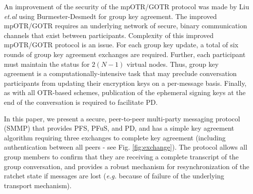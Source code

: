 \documentclass[%
preprint,
amsmath,amssymb,
aps,
prb,
floatfix,
]{revtex4-1}
\begin{document}
An improvement of the security of the mpOTR/GOTR protocol was made by Liu
\textit{et.al}\cite{ref:liu} using Burmester-Desmedt\cite{ref:burmester}
for group key agreement. The improved mpOTR/GOTR requires an
underlying network of secure, binary communication channels that exist between
participants.
Complexity of this improved mpOTR/GOTR protocol is an issue. For each group key
update, a total of six rounds of group key agreement exchanges are required.
Further, each participant must maintain the status for $2(N-1)$ virtual nodes.
Thus, group key agreement is a computationally-intensive task that
may preclude conversation participants from updating their encryption keys on a
per-message basis. Finally, as with all OTR-based schemes, publication of the
ephemeral signing keys at the end of the conversation is required to facilitate
PD.

In this paper, we present a secure, peer-to-peer multi-party messaging protocol
(SMMP) that provides PFS, PFuS, and PD, and has a simple key agreement
algorithm requiring three exchanges to complete key agreement (including
authentication between all peers - see Fig. \ref{fig:exchange}).
The protocol allows all group members to confirm that they are
receiving a complete transcript of the group conversation, and provides a
robust mechanism for resynchronization of the ratchet state if messages are lost
(\textit{e.g.} because of failure of the underlying transport mechanism).
\end{document}
